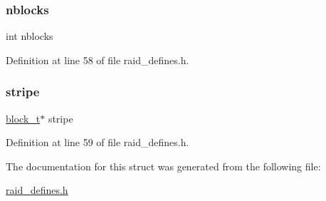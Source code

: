 \subsubsection{\texorpdfstring{nblocks}{nblocks}}
{\footnotesize\ttfamily int nblocks}



Definition at line 58 of file raid\+\_\+defines.\+h.

\mbox{\label{structstripe__s_a16ff6d534dd4944c7fc544e4247e5ff1}} 
\subsubsection{\texorpdfstring{stripe}{stripe}}
{\footnotesize\ttfamily \hyperlink{raid__defines_8h_a9497df9c1d65b018066a9760da7be4e6}{block\+\_\+t}$\ast$ stripe}



Definition at line 59 of file raid\+\_\+defines.\+h.



The documentation for this struct was generated from the following file\+:\begin{DoxyCompactItemize}
\item 
\hyperlink{raid__defines_8h}{raid\+\_\+defines.\+h}\end{DoxyCompactItemize}
